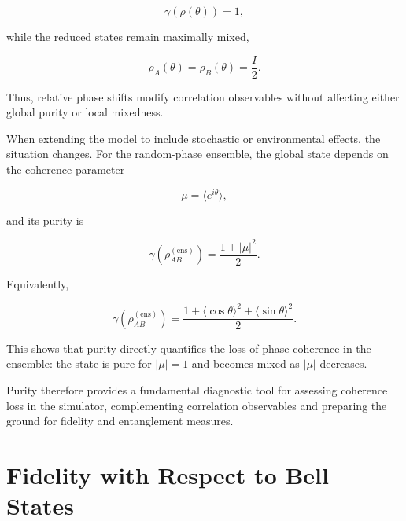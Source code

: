\begin{equation}
\gamma(\rho(\theta)) = 1,
\label{eq:phase_state_global_purity}
\end{equation}

while the reduced states remain maximally mixed,

\[
\rho_A(\theta)
=
\rho_B(\theta)
=
\frac{I}{2}.
\]

Thus, relative phase shifts modify correlation observables without affecting either global purity or local mixedness.

\medskip

When extending the model to include stochastic or environmental effects, the situation changes. For the random-phase ensemble, the global state depends on the coherence parameter

\begin{equation}
\mu
=
\langle e^{i\theta} \rangle,
\label{eq:coherence_parameter_mu}
\end{equation}

and its purity is

\begin{equation}
\gamma
\left(
\rho_{AB}^{(\mathrm{ens})}
\right)
=
\frac{1+|\mu|^2}{2}.
\label{eq:random_phase_ensemble_purity_mu}
\end{equation}

Equivalently,

\begin{equation}
\gamma
\left(
\rho_{AB}^{(\mathrm{ens})}
\right)
=
\frac{
1
+
\langle \cos\theta \rangle^2
+
\langle \sin\theta \rangle^2
}{2}.
\label{eq:random_phase_ensemble_purity_trigonometric}
\end{equation}

This shows that purity directly quantifies the loss of phase coherence in the ensemble: the state is pure for \( |\mu|=1 \) and becomes mixed as \( |\mu| \) decreases.

\medskip

Purity therefore provides a fundamental diagnostic tool for assessing coherence loss in the simulator, complementing correlation observables and preparing the ground for fidelity and entanglement measures.


\section{Fidelity with Respect to Bell States}

